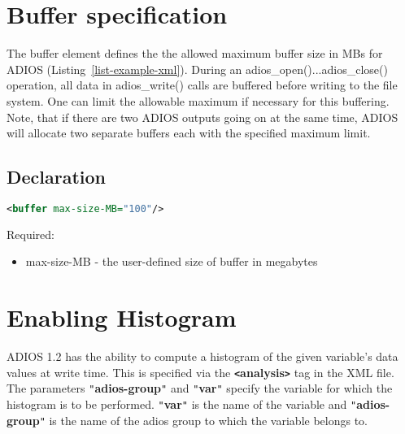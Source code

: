 \section{Buffer specification}
\label{section-xml-buffers-pecification}
The buffer element defines the the allowed maximum buffer size in MBs for ADIOS (Listing~\ref{list-example-xml}). 
During an adios\_open()...adios\_close() operation, all data in adios\_write() calls are buffered before writing to the
file system. One can limit the allowable maximum if necessary for this buffering. Note, that if there are two ADIOS outputs
going on at the same time, ADIOS will allocate two separate buffers each with the specified maximum limit.

\subsection{Declaration}
\begin{lstlisting}[language=XML]
<buffer max-size-MB="100"/>
\end{lstlisting}

Required:
\begin{itemize}
\item max-size-MB - the user-defined size of  buffer in megabytes 
\end{itemize}

\section{Enabling Histogram}

ADIOS 1.2 has the ability to {\color{color01} compute a histogram of the given 
variable's data values at write time}. This is specified via the \textbf{\texttt{<}analysis\texttt{>}} 
tag in the XML file. The parameters \texttt{"}\textbf{adios-group}\texttt{"} and 
\texttt{"}\textbf{var}\texttt{"} specify the variable for which the histogram is 
to be performed. \texttt{"}\textbf{var}\texttt{"} is the name of the variable and 
\texttt{"}\textbf{adios-group}\texttt{"} is the name of the adios group to which 
the variable belongs to.

